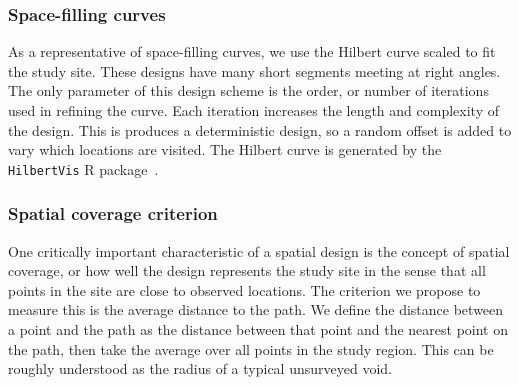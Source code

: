 \documentclass[review]{elsarticle}
\begin{document}
\subsubsection{Space-filling curves}

As a representative of space-filling curves, we use the Hilbert curve scaled
to fit the study site. These designs have many short segments meeting at right
angles. The only parameter of this design scheme is the order, or number of
iterations used in refining the curve. Each iteration increases the length and
complexity of the design. This is produces a deterministic design, so a random
offset is added to vary which locations are visited. The Hilbert curve is
generated by the \texttt{HilbertVis} R package~\citep{hilbertvis}.




\subsubsection{Spatial coverage criterion}

One critically important characteristic of a spatial design is the concept of
spatial coverage, or how well the design represents the study site in the sense
that all points in the site are close to observed locations. The criterion we
propose to measure this is the average distance to the path. We define the
distance between a point and the path as the distance between that point and
the nearest point on the path, then take the average over all points in the
study region. This can be roughly understood as the radius of a typical
unsurveyed void.
\end{document}
